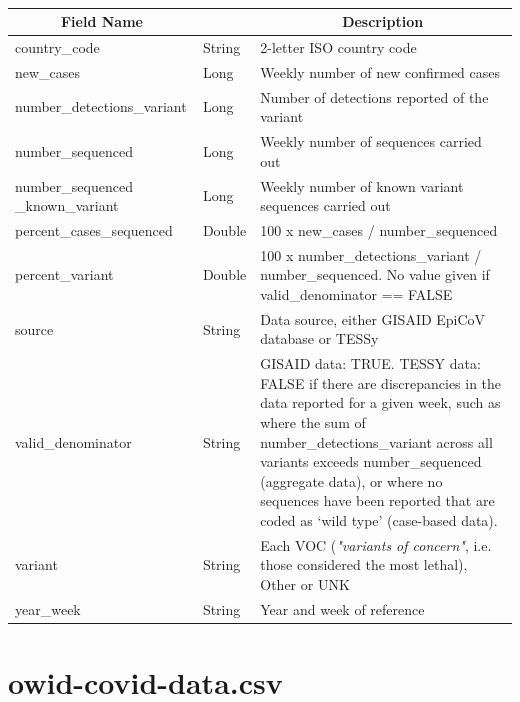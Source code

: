 \documentclass[a4paper,12pt]{article}
\begin{document}
\paragraph{}
\begin{center}
\begin{tabular}{|m{45mm}|>{\raggedright}m{16mm}|m{75mm}|}
\hline
\multicolumn{1}{|c|}{\textbf{ Field Name }}
& \multicolumn{1}{c|}{\textbf{ Data Type }} 
    	& \multicolumn{1}{c|}{\textbf{ Description }}\\
\hline
country\_code & String & 2-letter ISO country code \\
\hline
new\_cases & Long & Weekly number of new confirmed cases \\
\hline
number\_detections\_variant & Long & Number of detections reported of the variant \\
\hline
number\_sequenced & Long & Weekly number of sequences carried out \\
\hline
number\_sequenced \_known\_variant & Long & Weekly number of known variant sequences carried out \\
\hline
percent\_cases\_sequenced & Double & 100 x new\_cases / number\_sequenced \\
\hline
percent\_variant & Double & 100 x number\_detections\_variant / number\_sequenced. No value given if valid\_denominator == FALSE\\
\hline
source & String & Data source, either GISAID EpiCoV database or TESSy \\
\hline
valid\_denominator & String & GISAID data: TRUE. TESSY data: FALSE if there are discrepancies in the data reported for a given week, such as where the sum of number\_detections\_variant across all variants exceeds number\_sequenced (aggregate data), or where no sequences have been reported that are coded as ‘wild type’ (case-based data). \\
\hline
variant & String & Each VOC (\emph{"variants of concern"}, i.e. those considered the most lethal), Other or UNK \\
\hline
year\_week & String & Year and week of reference \\
\hline
\end{tabular}
\end{center}
\newpage

\section{owid-covid-data.csv}
\end{document}
